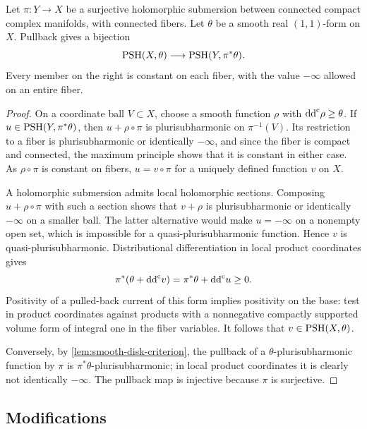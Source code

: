\begin{proposition}\label{prop:psh-descent-submersion}
Let $\pi\colon Y\to X$ be a surjective holomorphic submersion between connected compact complex manifolds, with connected fibers. Let $\theta$ be a smooth real $(1,1)$-form on $X$. Pullback gives a bijection
\[
 \mathrm{PSH}(X,\theta)\longrightarrow\mathrm{PSH}(Y,\pi^*\theta).
\]
Every member on the right is constant on each fiber, with the value $-\infty$ allowed on an entire fiber.
\end{proposition}
\begin{proof}
On a coordinate ball $V\subset X$, choose a smooth function $\rho$ with $\mathrm{dd}^{\mathrm{c}}\rho\geq\theta$. If $u\in\mathrm{PSH}(Y,\pi^*\theta)$, then $u+\rho\circ\pi$ is plurisubharmonic on $\pi^{-1}(V)$. Its restriction to a fiber is plurisubharmonic or identically $-\infty$, and since the fiber is compact and connected, the maximum principle shows that it is constant in either case. As $\rho\circ\pi$ is constant on fibers, $u=v\circ\pi$ for a uniquely defined function $v$ on $X$.

A holomorphic submersion admits local holomorphic sections. Composing $u+\rho\circ\pi$ with such a section shows that $v+\rho$ is plurisubharmonic or identically $-\infty$ on a smaller ball. The latter alternative would make $u=-\infty$ on a nonempty open set, which is impossible for a quasi-plurisubharmonic function. Hence $v$ is quasi-plurisubharmonic. Distributional differentiation in local product coordinates gives
\[
 \pi^*(\theta+\mathrm{dd}^{\mathrm{c}} v)=\pi^*\theta+\mathrm{dd}^{\mathrm{c}} u\geq0.
\]
Positivity of a pulled-back current of this form implies positivity on the base: test in product coordinates against products with a nonnegative compactly supported volume form of integral one in the fiber variables. It follows that $v\in\mathrm{PSH}(X,\theta)$.

Conversely, by \cref{lem:smooth-disk-criterion}, the pullback of a $\theta$-plurisubharmonic function by $\pi$ is $\pi^*\theta$-plurisubharmonic; in local product coordinates it is clearly not identically $-\infty$. The pullback map is injective because $\pi$ is surjective.
\end{proof}





\subsection{Modifications}

